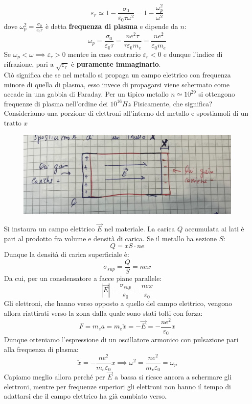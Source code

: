 \documentclass{book}
\begin{document}
    $$\varepsilon_{r} \simeq 1 - \frac{\sigma_{0}}{\varepsilon_{0}\tau \omega ^{2}} = 1- \frac{\omega_{p} ^{2}}{\omega ^{2}}$$
    dove $\omega_{p} ^{2} = \displaystyle \frac{\sigma_{0}}{\varepsilon_{0}\tau}$ è detta \textbf{frequenza di plasma} e dipende da $n$:
    $$\omega_{p} = \frac{\sigma_{0}}{\varepsilon_{0} \tau} = \frac{ne^{2} \tau}{\tau \varepsilon_{0} m_{e}} = \frac{ne^{2} }{ \varepsilon_{0} m_{e}}$$
    Se $\omega_{p} < \omega \implies \varepsilon_{r} >0$ mentre in caso contrario $\varepsilon_{r}<0$ e dunque l'indice di rifrazione, pari a $\sqrt{\varepsilon_{r}}$ è \textbf{puramente immaginario}.\\
    Ciò significa che se nel metallo si propaga un campo elettrico con frequenza minore di quella di plasma, esso invece di propagarsi viene schermato come accade in una gabbia di Faraday.
    Per un tipico metallo $n \simeq 10^{29}$ si ottengono frequenze di plasma nell'ordine dei $10^{16}Hz$
    Fisicamente, che significa?\\
    Consideriamo una porzione di elettroni all'interno del metallo e spostiamoli di un tratto $x$
    \begin{figure}[h!]
        \centering
        \includegraphics[width=0.75\linewidth]{img/trattoDeltaxboh.png}
    \end{figure}
    Si instaura un campo elettrico $\vec{E}$ nel materiale. La carica $Q$ accumulata ai lati è pari al prodotto fra volume e densità di carica. Se il metallo ha sezione $S$:
    $$Q = xS \cdot ne$$
    Dunque la densità di carica superficiale è:
    $$\sigma_{sup} = \frac{Q}{S} = nex$$
    Da cui, per un consdensatore a facce piane parallele:
    $$|\vec{E}| = \frac{\sigma_{sup}}{\varepsilon_{0}} = \frac{nex}{\varepsilon_{0}}$$
    Gli elettroni, che hanno verso opposto a quello del campo elettrico, vengono allora riattirati verso la zona dalla quale sono stati tolti con forza:
    $$F = m_{e}a = m_{e} \ddot{x} = - \vec{E} = -\frac{ne^{2}}{\varepsilon_{0}}x$$
    Dunque otteniamo l'espressione di un oscillatore armonico con pulsazione pari alla frequenza di plasma:
    $$\ddot{x} = -\frac{ne^{2}}{m_{e}\varepsilon_{0}}x \implies \omega ^{2} = \frac{ne^{2}}{m_{e}\varepsilon_{0}} = \omega_{p}$$
    Capiamo meglio allora perché per $\vec{E}$ a bassa si riesce ancora a schermare gli elettroni, mentre per frequenze superiori gli elettroni non hanno il tempo di adattarsi che il campo elettrico ha già cambiato verso.
\end{document}
